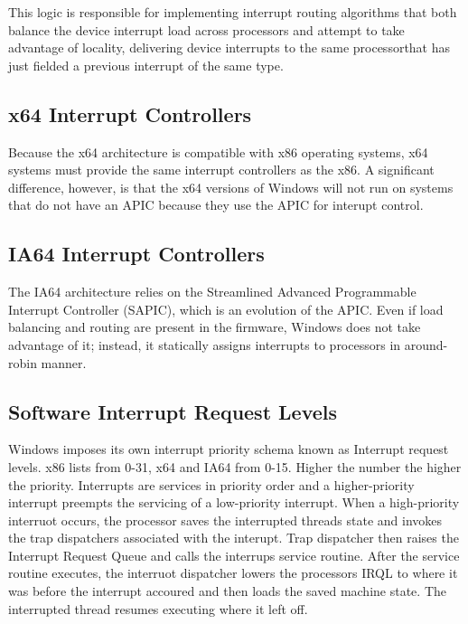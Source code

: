 \documentclass[letterpaper,10pt,draftclsnofoot,onecolumn]{IEEEtran}
\begin{document}
This logic is responsible for implementing interrupt routing algorithms that both balance the device interrupt load across processors and attempt to take advantage of locality, delivering device interrupts to the same processorthat has just fielded a previous interrupt of the same type.\cite{[1]}

\subsection*{x64 Interrupt Controllers}

Because the x64 architecture is compatible with x86 operating systems, x64 systems must provide the same interrupt controllers as the x86. A significant difference, however, is that the x64 versions of Windows will not run on systems that do not have an APIC because they use the APIC for interupt control.\cite{[1]}

\subsection*{IA64 Interrupt Controllers}

The IA64 architecture relies on the Streamlined Advanced Programmable Interrupt Controller (SAPIC), which is an evolution of the APIC. Even if load balancing and routing are present in the firmware, Windows does not take advantage of it; instead, it statically assigns interrupts to processors in around-robin manner.\cite{[1]}

\subsection*{Software Interrupt Request Levels}

Windows imposes its own interrupt priority schema known as Interrupt request levels. x86 lists from 0-31, x64 and IA64 from 0-15. Higher the number the higher the priority. Interrupts are services in priority order and a higher-priority interrupt preempts the servicing of a low-priority interrupt. When a high-priority interruot occurs, the processor saves the interrupted threads state and invokes the trap dispatchers associated with the interupt. Trap dispatcher then raises the Interrupt Request Queue and calls the interrups service routine. After the service routine executes, the interruot dispatcher lowers the processors IRQL to where it was before the interrupt accoured and then loads the saved machine state. The interrupted thread resumes executing where it left off.
\end{document}
